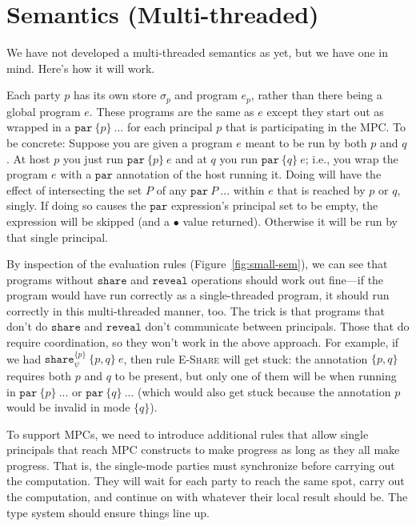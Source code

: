 \documentclass[10pt]{article}
\newcommand{\rulelab}[1]{{\small \textsc{#1}}}
\newcommand{\kw}[1]{\ensuremath{\mathtt{#1}}}
\newcommand{\epar}[2]{\ensuremath{\kw{par}~{#1}~{#2}}}
\newcommand{\eshare}[4]{\ensuremath{\kw{share}^{#2}_{#1}~{#3}~{#4}}}
\newcommand{\vcrash}{\ensuremath{\bullet}}
\newcommand{\env}{\ensuremath{\sigma}}
\begin{document}
\section{Semantics (Multi-threaded)}
\label{sec:MTsemantics}

We have not developed a multi-threaded semantics as yet, but we have
one in mind. Here's how it will work.

Each party $p$ has its own store $\env_p$ and program $e_p$, rather
than there being a global program $e$. These programs are the same as
$e$ except they start out as wrapped in a $\epar{\{p\}}{...}$ for each
principal $p$ that is participating in the MPC\@. To be concrete:
Suppose you are given a program $e$
meant to be run by both $p$ and $q$. At host $p$ you just run
$\epar{\{p\}}{e}$ and at $q$ you run $\epar{\{q\}}{e}$; i.e., you wrap
the program $e$ with a $\kw{par}$ annotation of the host running
it. Doing will have the effect of intersecting the set $P$ of any
$\epar{P}{...}$ within $e$ that is reached by $p$ or $q$, singly. If
doing so causes the $\kw{par}$ expression's principal set to be empty,
the expression will be skipped (and a $\vcrash$ value
returned). Otherwise it will be run by that single principal.

By inspection of the evaluation rules (Figure~\ref{fig:small-sem}), we can
see that programs without $\kw{share}$ and $\kw{reveal}$ operations
should work out fine---if the program would have run correctly as a
single-threaded program, it should run correctly in this
multi-threaded manner, too. The trick is that programs that don't do
$\kw{share}$ and $\kw{reveal}$ don't communicate between
principals. Those that do require coordination, so they won't work in
the above approach. For example, if we had
$\eshare{\psi}{\{p\}}{\{p,q\}}{e}$, then rule \rulelab{E-Share} will
get stuck: the annotation $\{p,q\}$ requires both $p$ and $q$ to be
present, but only one of them will be when running in
$\epar{\{p\}}{...}$ or $\epar{\{q\}}{...}$ (which would also get stuck
because the annotation $p$ would be invalid in mode $\{q\}$).

To support MPCs, we need to introduce additional rules that allow
single principals that reach MPC constructs to make progress as long
as they all make progress. That is, the single-mode parties must
synchronize before carrying out the computation. They will wait for
each party to reach the same spot, carry out the computation, and
continue on with whatever their local result should be. The type
system should ensure things line up.
\end{document}
